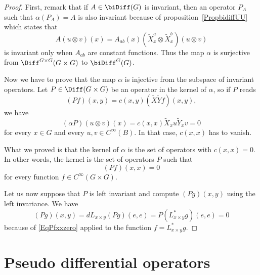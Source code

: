 \begin{proof}
	First, remark that if $A\in\biDiff(G)$ is invariant, then an operator $P_A$ such that $\alpha(P_A)=A$ is also invariant because of proposition~\ref{PropbidiffUU} which states that
	\begin{equation}
		A(u\otimes v)(x)=A_{ab}(x)(\tilde X^a_x\otimes \tilde X^b_x)(u\otimes v)
	\end{equation}
	is invariant only when $A_{ab}$ are constant functions. Thus the map $\alpha$ is surjective from $\Diff^{G\times G}(G\times G)$ to $\biDiff^G(G)$.

	Now we have to prove that the map $\alpha$ is injective from the subspace of invariant operators. Let $P\in\Diff(G\times G)$ be an operator in the kernel of $\alpha$, so if $P$ reads
	\begin{equation}
		(Pf)(x,y)=c(x,y)(\tilde X\tilde Yf)(x,y),
	\end{equation}
	we have
	\begin{equation}
		(\alpha P)(u\otimes v)(x)=c(x,x)\tilde X_xu\tilde Y_xv=0
	\end{equation}
	for every $x\in G$ and every $u,v\in C^{\infty}(B)$. In that case, $c(x,x)$ has to vanish.

	What we proved is that the kernel of $\alpha$ is the set of operators with $c(x,x)=0$. In other words, the kernel is the set of operators $P$ such that
	\begin{equation}	\label{EqPfxxzero}
		(Pf)(x,x)=0
	\end{equation}
	for every function $f\in C^{\infty}(G\times G)$.

	Let us now suppose that $P$ is left invariant and compute $(Pg)(x,y)$ using the left invariance. We have
	\begin{equation}
		(Pg)(x,y)=dL_{x\times y}(Pg)(e,e)=P(L^*_{x\times y}g)(e,e)=0
	\end{equation}
	because of \eqref{EqPfxxzero} applied to the function $f=L^*_{x\times y}g$.
\end{proof}


\section{Pseudo differential operators}

